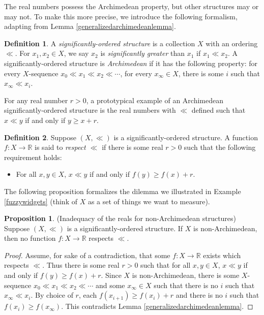 \documentclass[reqno]{article}
\theoremstyle{definition}
\newtheorem{proposition}[theorem]{Proposition}
\newtheorem{definition}{Definition}
\begin{document}
The real numbers possess the Archimedean property, but other structures
may or may not. To make this more precise,
we introduce the following formalism, adapting from Lemma \ref{generalizedarchimedeanlemma}.

\begin{definition}
    A \emph{significantly-ordered structure} is a collection $X$ with
    an ordering $\ll$.
    For $x_1,x_2\in X$, we say $x_2$ is \emph{significantly greater}
    than $x_1$ if $x_1\ll x_2$.
    A significantly-ordered structure is \emph{Archimedean} if it
    has the following property: for every $X$-sequence
    $x_0\ll x_1\ll x_2 \ll \cdots$,
    for every $x_\infty\in X$, there is some $i$ such that $x_\infty\ll x_i$.
\end{definition}

For any real number $r>0$, a prototypical example of an Archimedean
significantly-ordered structure is the real
numbers with $\ll$ defined such that
$x\ll y$ if and only if $y\geq x+r$.

\begin{definition}
    Suppose $(X,\ll)$ is a significantly-ordered structure.
    A function $f:X\to\mathbb R$ is said to \emph{respect $\ll$}
    if there is some real $r>0$ such that the following requirement holds:
    \begin{itemize}
        \item
        For all $x,y\in X$, $x\ll y$ if and only if
        $f(y)\geq f(x)+r$.
    \end{itemize}
\end{definition}

The following proposition formalizes the dilemma we illustrated in
Example \ref{fuzzywidgets} (think of $X$ as a set of things we
want to measure).

\begin{proposition}
\label{maindilemma}
(Inadequacy of the reals for non-Archimedean structures)
    Suppose $(X,\ll)$ is a significantly-ordered structure.
    If $X$ is non-Archimedean, then no function $f:X\to\mathbb R$
    respects $\ll$.
\end{proposition}

\begin{proof}
    Assume, for sake of a contradiction, that some $f:X\to\mathbb R$
    exists which respects $\ll$. Thus there is some real $r>0$ such that
    for all $x,y\in X$, $x\ll y$ if and only if $f(y)\geq f(x)+r$.
    Since $X$ is non-Archimedean, there is some $X$-sequence
    $x_0\ll x_1\ll x_2\ll\cdots$ and some $x_\infty\in X$
    such that there is no $i$ such that $x_\infty\ll x_i$.
    By choice of $r$, each $f(x_{i+1})\geq f(x_i)+r$ and there is no
    $i$ such that $f(x_i)\geq f(x_\infty)$.
    This contradicts Lemma \ref{generalizedarchimedeanlemma}.
\end{proof}
\end{document}
